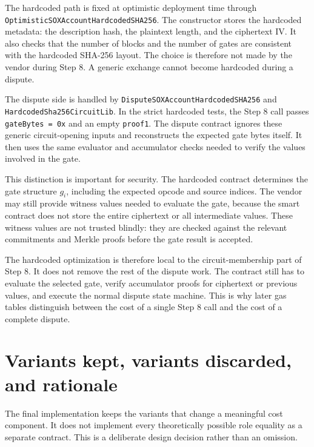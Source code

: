 The hardcoded path is fixed at optimistic deployment time through
\texttt{OptimisticSOXAccountHardcodedSHA256}. The constructor stores the hardcoded metadata:
the description hash, the plaintext length, and the ciphertext IV. It also checks that the
number of blocks and the number of gates are consistent with the hardcoded SHA-256 layout.
The choice is therefore not made by the vendor during Step 8. A generic exchange cannot
become hardcoded during a dispute.

The dispute side is handled by \texttt{DisputeSOXAccountHardcodedSHA256} and
\texttt{HardcodedSha256CircuitLib}. In the strict hardcoded tests, the Step 8 call passes
\texttt{gateBytes = 0x} and an empty \texttt{proof1}. The dispute contract ignores these
generic circuit-opening inputs and reconstructs the expected gate bytes itself. It then uses
the same evaluator and accumulator checks needed to verify the values involved in the gate.

This distinction is important for security. The hardcoded contract determines the gate
structure \(g_i\), including the expected opcode and source indices. The vendor may still
provide witness values needed to evaluate the gate, because the smart contract does not
store the entire ciphertext or all intermediate values. These witness values are not trusted
blindly: they are checked against the relevant commitments and Merkle proofs before the gate
result is accepted.

The hardcoded optimization is therefore local to the circuit-membership part of Step 8. It
does not remove the rest of the dispute work. The contract still has to evaluate the
selected gate, verify accumulator proofs for ciphertext or previous values, and execute the
normal dispute state machine. This is why later gas tables distinguish between the cost of a
single Step 8 call and the cost of a complete dispute.

\section{Variants kept, variants discarded, and rationale}

The final implementation keeps the variants that change a meaningful cost component. It
does not implement every theoretically possible role equality as a separate contract. This
is a deliberate design decision rather than an omission.

